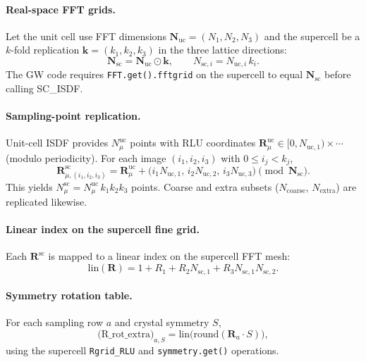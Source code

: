 \documentclass[11pt,a4paper]{article}
\begin{document}
\paragraph{Real-space FFT grids.}
Let the unit cell use FFT dimensions $\mathbf N_{\mathrm{uc}} = (N_1,N_2,N_3)$
and the supercell be a $k$-fold replication
$\mathbf k = (k_1,k_2,k_3)$ in the three lattice directions:
\begin{equation}
  \mathbf N_{\mathrm{sc}} = \mathbf N_{\mathrm{uc}} \odot \mathbf k,
  \qquad
  N_{\mathrm{sc},i} = N_{\mathrm{uc},i}\, k_i .
\end{equation}
The GW code requires \texttt{FFT.get().fftgrid} on the supercell to equal
$\mathbf N_{\mathrm{sc}}$ before calling SC\_ISDF.

\paragraph{Sampling-point replication.}
Unit-cell ISDF provides $N_\mu^{\mathrm{uc}}$ points with RLU coordinates
$\mathbf R^{\mathrm{uc}}_\mu \in [0,N_{\mathrm{uc},1})\times\cdots$
(modulo periodicity).
For each image $(i_1,i_2,i_3)$ with $0\le i_j<k_j$,
\begin{equation}
  \mathbf R^{\mathrm{sc}}_{\mu,(i_1,i_2,i_3)}
  = \mathbf R^{\mathrm{uc}}_\mu
    + \bigl(i_1 N_{\mathrm{uc},1},\, i_2 N_{\mathrm{uc},2},\, i_3 N_{\mathrm{uc},3}\bigr)
  \pmod{\mathbf N_{\mathrm{sc}}}.
\end{equation}
This yields
$N_\mu^{\mathrm{sc}} = N_\mu^{\mathrm{uc}}\, k_1 k_2 k_3$ points.
Coarse and extra subsets ($N_{\mathrm{coarse}}$, $N_{\mathrm{extra}}$) are
replicated likewise.

\paragraph{Linear index on the supercell fine grid.}
Each $\mathbf R^{\mathrm{sc}}$ is mapped to a linear index on the supercell FFT mesh:
\begin{equation}
  \mathrm{lin}(\mathbf R)
  = 1 + R_1 + R_2 N_{\mathrm{sc},1} + R_3 N_{\mathrm{sc},1} N_{\mathrm{sc},2}.
\end{equation}

\paragraph{Symmetry rotation table.}
For each sampling row $a$ and crystal symmetry $S$,
\begin{equation}
  \bigl(\mathrm{R\_rot\_extra}\bigr)_{a,S}
  = \mathrm{lin}\!\bigl(\mathrm{round}(\mathbf R_a \cdot S)\bigr),
\end{equation}
using the supercell \texttt{Rgrid\_RLU} and \texttt{symmetry.get()} operations.
\end{document}
